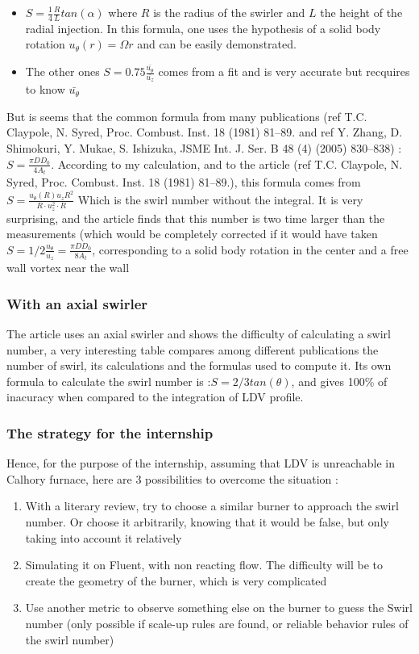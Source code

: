 \begin{itemize}
\item $S=\frac{1}{4} \frac{R}{L} tan(\alpha)$ where $R$ is the radius of the swirler and $L$ the height of the radial injection. In this formula, one uses the hypothesis of a solid body rotation $u_{\theta}(r)=\Omega r$ and can be easily demonstrated.
\item The other ones $S=0.75\frac{\bar{u_{\theta}}}{\bar{u_{z}}}$ comes from a fit and is very accurate but recquires to know $\bar{u_{\theta}}$
\end{itemize}

But is seems that the common formula from many publications (ref T.C. Claypole, N. Syred, Proc. Combust. Inst. 18 (1981) 81–89. and ref Y. Zhang, D. Shimokuri, Y. Mukae, S. Ishizuka, JSME Int. J. Ser. B 48 (4) (2005)
830–838) : $S=\frac{\pi D D_{0}}{4A_{t}}$. According to my calculation, and to the article (ref T.C. Claypole, N. Syred, Proc. Combust. Inst. 18 (1981) 81–89.), this formula comes from $S=\frac{u_{\theta}(R)u_{z}R^2}{R \cdot u_{z}^2 \cdot R}$ Which is the swirl number without the integral. It is very surprising, and the article \cite{durox_flame_2013} finds that this number is two time larger than the measurements (which would be completely corrected if it would have taken $S=1/2 \frac{u_{\theta}}{u_{z}}=\frac{\pi D D_{0}}{8A_{t}} $, corresponding to a solid body rotation in the center and a free wall vortex near the wall


\subsubsection{With an axial swirler}

The article\cite{palies_combined_2010}  uses an axial swirler and shows the difficulty of calculating a swirl number, a very interesting table compares among different publications the number of swirl, its calculations and the formulas used to compute it. Its own formula to calculate the swirl number is :$S=2/3 tan(\theta)$, and gives 100\% of inacuracy when compared to the integration of LDV profile.

\subsubsection{The strategy for the internship}

Hence, for the purpose of the internship, assuming that LDV is unreachable in Calhory furnace,  here are 3 possibilities to overcome the situation :
\begin{enumerate}
\item With a literary review, try to choose a similar burner to approach the swirl number. Or choose it arbitrarily, knowing that it would be false, but only taking into account it relatively
\item Simulating it on Fluent, with non reacting flow. The difficulty will be to create the geometry of the burner, which is very complicated
\item Use another metric to observe something else on the burner to guess the Swirl number (only possible if scale-up rules are found, or reliable behavior rules of the swirl number)
\end{enumerate}

